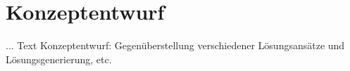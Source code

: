 \chapter{Konzeptentwurf}
\label{cha:Konzeptentwurf}

... Text Konzeptentwurf: Gegenüberstellung verschiedener Lösungsansätze und Lösungsgenerierung, etc.